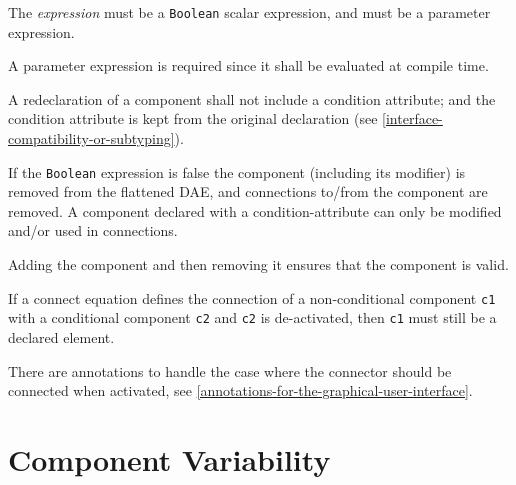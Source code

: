 The \emph{expression} must be a \lstinline!Boolean! scalar expression, and must be a parameter expression.

\begin{nonnormative}
A parameter expression is required since it shall be evaluated at compile time.
\end{nonnormative}

A redeclaration of a component shall not include a condition attribute;
and the condition attribute is kept from the original declaration (see
\cref{interface-compatibility-or-subtyping}).

If the \lstinline!Boolean! expression is false the component (including its modifier) is removed from the flattened DAE, and connections to/from the component are removed.
A component declared with a condition-attribute can only be modified and/or used in connections.

\begin{nonnormative}
Adding the component and then removing it ensures that the component is valid.

If a connect equation defines the connection of a non-conditional component \lstinline!c1! with a conditional component \lstinline!c2! and \lstinline!c2! is de-activated, then \lstinline!c1! must still be a declared element.

There are annotations to handle the case where the connector should be connected when activated, see \cref{annotations-for-the-graphical-user-interface}.
\end{nonnormative}


\section{Component Variability}\label{component-variability}

